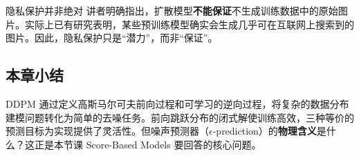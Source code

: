 \begin{warningbox}{隐私保护并非绝对}
讲者明确指出，扩散模型\textbf{不能保证}不生成训练数据中的原始图片。实际上已有研究表明，某些预训练模型确实会生成几乎可在互联网上搜索到的图片。因此，隐私保护只是``潜力''，而非``保证''。
\end{warningbox}

\subsection{本章小结}

DDPM 通过定义高斯马尔可夫前向过程和可学习的逆向过程，将复杂的数据分布建模问题转化为简单的去噪任务。前向跳跃分布的闭式解使训练高效，三种等价的预测目标为实现提供了灵活性。但噪声预测器（$\epsilon$-prediction）的\textbf{物理含义}是什么？这正是本节课 Score-Based Models 要回答的核心问题。

